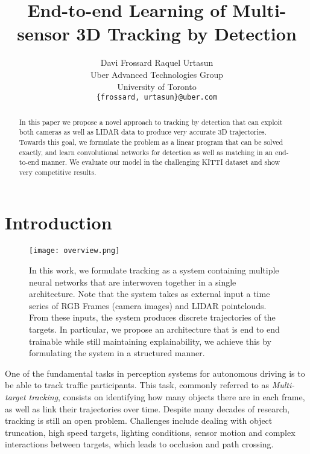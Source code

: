 \documentclass[letterpaper, 10 pt, conference]{ieeeconf}  \pdfminorversion=4
\title{\LARGE \bf
End-to-end Learning of Multi-sensor 3D Tracking by Detection
}
\author{Davi Frossard \qquad Raquel Urtasun\\
Uber Advanced Technologies Group\\
University of Toronto\\
{\tt\small \{frossard, urtasun\}@uber.com}}
\begin{document}
\maketitle
\thispagestyle{empty}
\pagestyle{empty}


\begin{abstract}

  In this paper we propose a novel approach to  tracking by detection
that can exploit both cameras as well as LIDAR data to produce very accurate 3D trajectories.
Towards this goal, we formulate the  problem as a linear program that can be solved exactly, and learn convolutional networks for detection as well as matching in an end-to-end manner.  We evaluate our model in the challenging KITTI dataset and show very competitive results.



\end{abstract}

\section{Introduction}
\label{sec:introduction}

\begin{figure*}[t]
\centering
  \texttt{[image: overview.png]}
  \caption{In this work, we formulate tracking as a system containing multiple neural networks that are interwoven together in a single architecture. Note that the system takes as external input a time series of RGB Frames (camera images) and LIDAR pointclouds. From these inputs, the system produces discrete trajectories of the targets. In particular, we propose an architecture that is end to end trainable while still maintaining explainability, we achieve this by formulating the system in a structured manner.}
  \label{fig:framework_viz}
\end{figure*}

One of the fundamental tasks in perception systems for autonomous driving is to be able to track traffic participants. This task, commonly referred to as {\it Multi-target tracking},  consists on  identifying how many objects there are in each frame, as well as link their trajectories over time. Despite many decades of research, tracking is still an open problem. Challenges include dealing with object truncation, high speed targets, lighting conditions, sensor motion and  complex interactions between targets, which leads to occlusion and path crossing.
\end{document}
